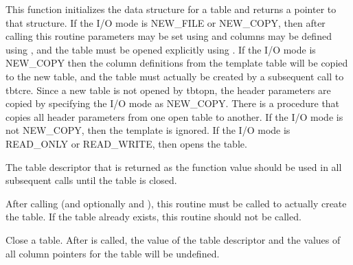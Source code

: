 \begin{callseq}
\end{callseq}

This function initializes the data structure for a table and returns a
pointer to that structure.
If the I/O mode is NEW\_FILE or NEW\_COPY,
then after calling this routine
parameters may be set using  and columns may be defined using
, and the table must be opened explicitly using .
If the I/O mode is NEW\_COPY then the column definitions from the template
table will be copied to the new table,
and the table must actually be created by a subsequent call to tbtcre.
Since a new table is not opened by tbtopn, the header parameters
are  copied by specifying the I/O mode as NEW\_COPY.
There is a procedure  that copies all header parameters
from one open table to another.
If the I/O mode is not NEW\_COPY, then the template is ignored.
If the I/O mode is READ\_ONLY or READ\_WRITE, then 
opens the table.

The table descriptor that is returned as the function value should be used in
all subsequent calls until the table is closed.

\callseqfcn

\begin{callseq}
\end{callseq}

After calling 
(and optionally  and ),
this routine must be called to actually create the table.
If the table already exists, this routine should not be called.

\callseqtable

\begin{callseq}
\end{callseq}

Close a table.  After  is called, the value of the table
descriptor and the values of
all column pointers for the table will be undefined.

